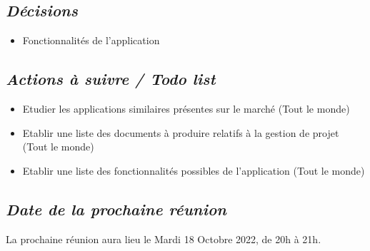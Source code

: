 \documentclass[french,a4paper]{article}
\begin{document}
\subsection*{\textit{Décisions}}
\begin{itemize}
  \item Fonctionnalités de l'application
\end{itemize}

\subsection*{\textit{Actions à suivre / Todo list}}
\begin{itemize}
  \item Etudier les applications similaires présentes sur le marché (Tout le monde)
  \item Etablir une liste des documents à produire relatifs à la gestion de projet (Tout le monde)
  \item Etablir une liste des fonctionnalités possibles de l'application (Tout le monde)
\end{itemize}

\subsection*{\textit{Date de la prochaine réunion}}
La prochaine réunion aura lieu le Mardi 18 Octobre 2022, de 20h à 21h.
\end{document}
